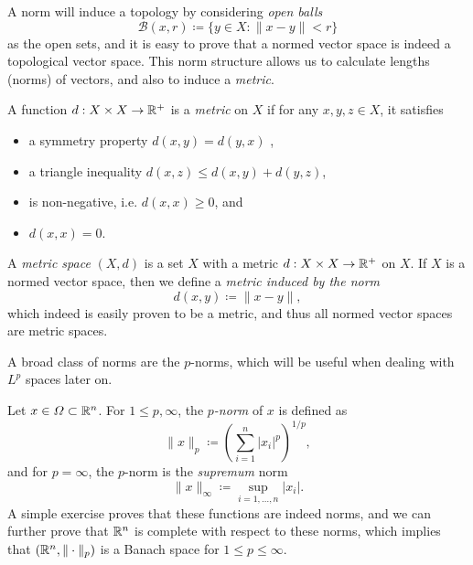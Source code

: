 A norm will induce a topology by considering \emph{open balls}
\begin{equation}
    \mathcal{B}(x,r) \coloneqq \{y\in X: \|x-y\|<r\}
\end{equation}
as the open sets, and it is easy to prove that a normed vector space is indeed a topological vector space. This norm structure allows us to calculate lengths (norms) of vectors, and also to induce a \emph{metric}.
\begin{definition}
    A function $d:X\times X\to \mathbb{R}^+$ is a \emph{metric} on $X$ if for any $x,y,z\in X$, it satisfies
    \begin{itemize}
        \item a symmetry property $d(x,y) = d(y,x)$ ,
        \item a triangle inequality $d(x,z) \leq d(x,y) + d(y,z)$,
        \item is non-negative, i.e. $d(x,x) \geq 0$, and
        \item $d(x,x)=0$.
    \end{itemize}
    A \emph{metric space} $(X,d)$ is a set $X$ with a metric $d:X\times X\to \mathbb{R}^+$ on $X$. If $X$ is a normed vector space, then we define a \emph{metric induced by the norm} 
    \begin{equation}
        d(x,y) \coloneqq \|x-y\|,
    \end{equation}
    which indeed is easily proven to be a metric, and thus all normed vector spaces are metric spaces. 
\end{definition}
A broad class of norms are the $p$-norms, which will be useful when dealing with $L^p$ spaces later on. 
\begin{definition}
    Let $x\in\Omega\subset\mathbb{R}^n$. For $1\leq p, \infty$, the \emph{$p$-norm} of $x$ is defined as 
    \begin{equation}
        \|x\|_p \coloneqq \left(\sum_{i=1}^n |x_i|^p\right)^{1/p},
    \end{equation}
    and for $p=\infty$, the $p$-norm is the \emph{supremum} norm
    \begin{equation}
        \|x\|_\infty \coloneqq \sup_{i=1,\dots,n} |x_i|.
    \end{equation}
    A simple exercise proves that these functions are indeed norms, and we can further prove that $\mathbb{R}^n$ is complete with respect to these norms, which implies that $(\mathbb{R}^n, \|\cdot\|_p)$ is a Banach space for $1\leq p\leq \infty$.
\end{definition}

